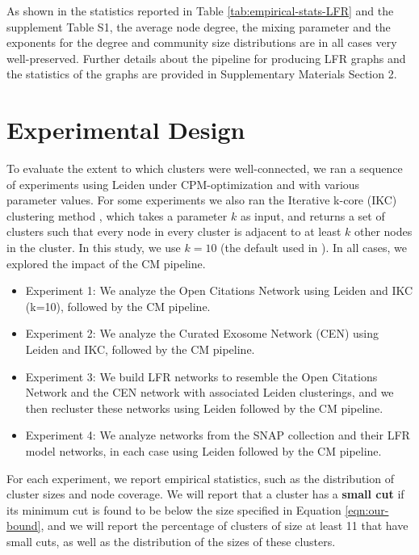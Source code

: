 \documentclass[11pt]{article}   	%
\begin{document}
As shown in the statistics reported in Table \ref{tab:empirical-stats-LFR} and the supplement  Table S1, the average node degree, the mixing parameter and the exponents for the degree and community size distributions are in all cases very well-preserved. Further details about the pipeline for producing LFR graphs and the statistics of the graphs are provided in Supplementary Materials Section 2.

\section{Experimental Design}
\label{sec:expt-design}
To evaluate the extent to which clusters were well-connected, we ran a sequence of experiments using Leiden under CPM-optimization and with various parameter values. For some experiments we also ran the Iterative k-core (IKC) clustering method \citep{Wedell2022}, which takes a parameter $k$ as input, and returns a set of clusters such that every node in every cluster is adjacent to at least $k$ other nodes in the cluster. In this study, we use $k=10$ (the default used in \cite{Wedell2022}).
In all cases, we explored the impact of the CM pipeline.
\begin{itemize}
\item Experiment 1: We analyze the Open Citations Network using Leiden  and IKC (k=10), followed by the CM pipeline.
\item Experiment 2: We analyze the Curated Exosome Network (CEN) using Leiden and IKC, followed by the CM pipeline.
\item Experiment 3: We build LFR networks to resemble the Open Citations Network and the CEN network with associated  Leiden clusterings, and we then recluster these networks using Leiden followed by the CM pipeline.
\item Experiment 4: We analyze networks from the SNAP collection and their LFR model networks, in each case using Leiden followed by the CM pipeline.
\end{itemize}

For each experiment, we report empirical statistics, such as the distribution of cluster sizes and node  coverage.
We will report that a cluster has a {\bf small cut} if its minimum cut is found to be below  the size specified in
 Equation \ref{eqn:our-bound}, and we will report the percentage of clusters of size at least 11 that have small cuts, as well as the distribution of the sizes
 of these clusters.
\end{document}
